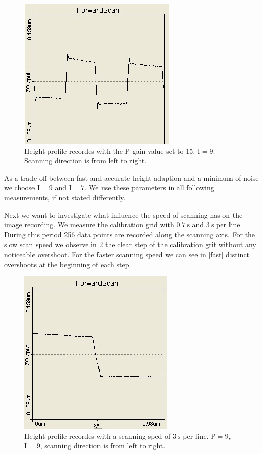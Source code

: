 \documentclass[paper=a4,fontsize=10pt,DIV=18,twocolumn,parskip=half]{scrartcl}
\numberwithin{equation}{section}    %
\begin{document}
\begin{figure}[htp]
    \begin{center}
        \includegraphics[width=0.6\columnwidth]{Bilder/vielP}
        \caption{Height profile recordes with the P-gain value set to 15. 
        $\mathrm{I}=9$. Scanning direction is from left to right.}
        \label{vielP}
    \end{center}
\end{figure}

As a trade-off between fast and accurate height adaption and a minimum of noise 
we choose $\mathrm{I}=9$ and $\mathrm{I}=7$. We use these parameters in all 
following measurements, if not stated differently.

Next we want to investigate what influence the speed of scanning has on the 
image recording. We measure the calibration grid with $\SI{0.7}{\second}$ and 
$\SI{3}{\second}$ per line. During this period 256 data points are recorded 
along the scanning axis.  For the slow scan speed we observe in \ref{slow} the 
clear step of the calibration grit without any noticeable overshoot. For the 
faster scanning speed we can see in \ref{fast} distinct overshoots at the 
beginning of each step.

\begin{figure}[htp]
    \begin{center}
        \includegraphics[width=0.6\columnwidth]{Bilder/slow}
        \caption{Height profile recordes with a scanning sped of 
        $\SI{3}{\second}$ per line. $\mathrm{P}=9$, $\mathrm{I}=9$, scanning 
        direction is from left to right.}
        \label{slow}
    \end{center}
\end{figure}
\end{document}
